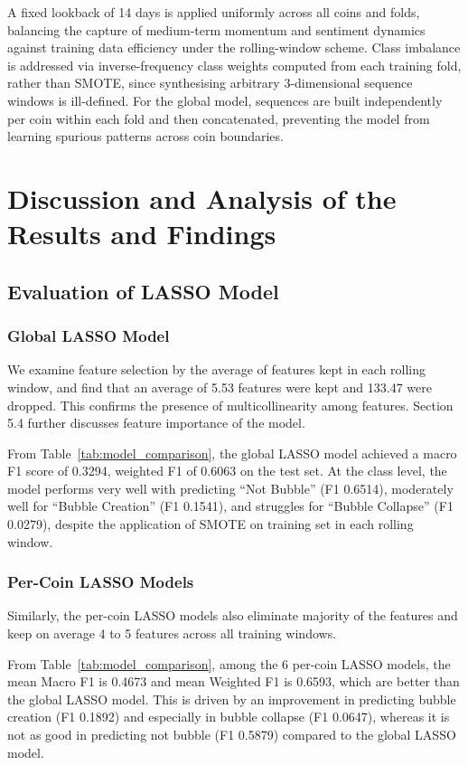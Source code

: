 \documentclass[12pt,a4paper]{article}
\begin{document}
A fixed lookback of 14 days is applied uniformly across all coins and folds, balancing the capture of medium-term momentum and sentiment dynamics against training data efficiency under the rolling-window scheme. Class imbalance is addressed via inverse-frequency class weights computed from each training fold, rather than SMOTE, since synthesising arbitrary 3-dimensional sequence windows is ill-defined. For the global model, sequences are built independently per coin within each fold and then concatenated, preventing the model from learning spurious patterns across coin boundaries.




\section{Discussion and Analysis of the Results and Findings}

\subsection{Evaluation of LASSO Model}
\subsubsection{Global LASSO Model}
We examine feature selection by the average of features kept in each rolling window, and find that an average of 5.53 features were kept and  133.47 were dropped. This confirms the presence of multicollinearity among features. Section 5.4 further discusses feature importance of the model. 

From Table~\ref{tab:model_comparison}, the global LASSO model achieved a macro F1 score of 0.3294, weighted F1 of 0.6063 on the test set. At the class level, the model performs very well with predicting “Not Bubble” (F1 0.6514), moderately well for “Bubble Creation” (F1 0.1541), and struggles for “Bubble Collapse” (F1 0.0279), despite the application of SMOTE on training set in each rolling window.  

\subsubsection{Per-Coin LASSO Models}
Similarly, the per-coin LASSO models also eliminate majority of the features and keep on average 4 to 5 features across all training windows. 

From Table~\ref{tab:model_comparison}, among the 6 per-coin LASSO models, the mean Macro F1 is 0.4673 and mean Weighted F1 is 0.6593, which are better than the global LASSO model. This is driven by an improvement in predicting bubble creation (F1 0.1892) and especially in bubble collapse (F1 0.0647), whereas it is not as good in predicting not bubble (F1 0.5879) compared to the global LASSO model.
\end{document}
